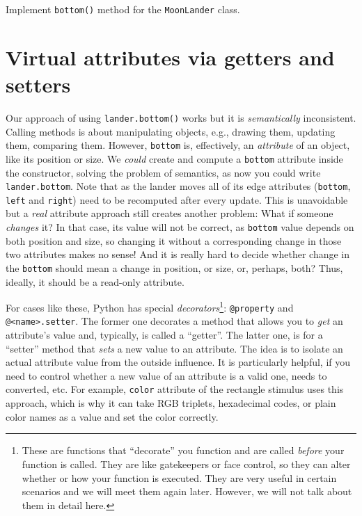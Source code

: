 \documentclass[
]{book}
\begin{document}
Implement \texttt{bottom()} method for the \texttt{MoonLander} class.

\hypertarget{getter-setter}{%
\section{Virtual attributes via getters and setters}\label{getter-setter}}

Our approach of using \texttt{lander.bottom()} works but it is \emph{semantically} inconsistent. Calling methods is about manipulating objects, e.g., drawing them, updating them, comparing them. However, \texttt{bottom} is, effectively, an \emph{attribute} of an object, like its position or size. We \emph{could} create and compute a \texttt{bottom} attribute inside the constructor, solving the problem of semantics, as now you could write \texttt{lander.bottom}. Note that as the lander moves all of its edge attributes (\texttt{bottom}, \texttt{left} and \texttt{right}) need to be recomputed after every update. This is unavoidable but a \emph{real} attribute approach still creates another problem: What if someone \emph{changes} it? In that case, its value will not be correct, as \texttt{bottom} value depends on both position and size, so changing it without a corresponding change in those two attributes makes no sense! And it is really hard to decide whether change in the \texttt{bottom} should mean a change in position, or size, or, perhaps, both? Thus, ideally, it should be a read-only attribute.

For cases like these, Python has special \emph{decorators}\footnote{These are functions that ``decorate'' you function and are called \emph{before} your function is called. They are like gatekeepers or face control, so they can alter whether or how your function is executed. They are very useful in certain scenarios and we will meet them again later. However, we will not talk about them in detail here.}: \texttt{@property} and \texttt{@\textless{}name\textgreater{}.setter}. The former one decorates a method that allows you to \emph{get} an attribute's value and, typically, is called a ``getter''. The latter one, is for a ``setter'' method that \emph{sets} a new value to an attribute. The idea is to isolate an actual attribute value from the outside influence. It is particularly helpful, if you need to control whether a new value of an attribute is a valid one, needs to converted, etc. For example, \texttt{color} attribute of the rectangle stimulus uses this approach, which is why it can take RGB triplets, hexadecimal codes, or plain color names as a value and set the color correctly.
\end{document}
